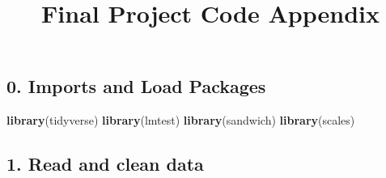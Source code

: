 \documentclass[
]{article}
\title{Final Project Code Appendix}
\author{}
\date{\vspace{-2.5em}}
\newenvironment{Shaded}{\begin{snugshade}}{\end{snugshade}}
\newcommand{\FunctionTok}[1]{\textcolor[rgb]{0.13,0.29,0.53}{\textbf{#1}}}
\newcommand{\NormalTok}[1]{#1}
\begin{document}
\maketitle

\subsection{0. Imports and Load
Packages}\label{imports-and-load-packages}

\begin{Shaded}
\begin{Highlighting}[]
\FunctionTok{library}\NormalTok{(tidyverse)}
\FunctionTok{library}\NormalTok{(lmtest)}
\FunctionTok{library}\NormalTok{(sandwich)}
\FunctionTok{library}\NormalTok{(scales)}
\end{Highlighting}
\end{Shaded}

\subsection{1. Read and clean data}\label{read-and-clean-data}
\end{document}
